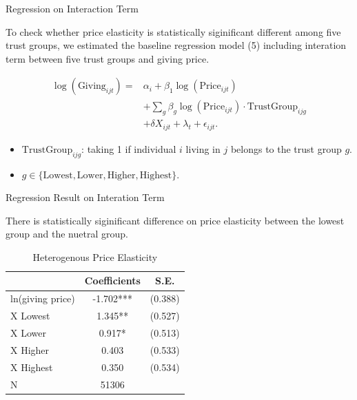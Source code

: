 \documentclass[
  ignorenonframetext,
]{beamer}
\providecommand{\tightlist}{%
  \setlength{\itemsep}{0pt}\setlength{\parskip}{0pt}}
\begin{document}
\begin{frame}{Regression on Interaction Term}
\protect\hypertarget{regression-on-interaction-term}{}

To check whether price elasticity is statistically siginificant
different among five trust groups, we estimated the baseline regression
model (5) including interation term between five trust groups and giving
price.

\begin{align*}
    \log(\text{Giving}_{ijt}) 
    =& \alpha_i + \beta_1 \log(\text{Price}_{ijt}) \\
    &+ \sum_g \beta_g \log(\text{Price}_{ijt}) \cdot \text{TrustGroup}_{ijg}  \\
    &+ \delta X_{ijt} + \lambda_t + \epsilon_{ijt}.
\end{align*}

\begin{itemize}
\tightlist
\item
  \(\text{TrustGroup}_{ijg}\): taking 1 if individual \(i\) living in
  \(j\) belongs to the trust group \(g\).
\item
  \(g \in \{ \text{Lowest}, \text{Lower}, \text{Higher}, \text{Highest} \}\).
\end{itemize}

\end{frame}

\begin{frame}{Regression Result on Interation Term}
\protect\hypertarget{regression-result-on-interation-term}{}

There is statistically siginificant difference on price elasticity
between the lowest group and the nuetral group.

\begin{table}

\caption{\label{tab:kableEstimateInteractionByTrustGroup}Heterogenous Price Elasticity}
\centering
\begin{tabular}[t]{lcc}
\toprule
 & Coefficients & S.E.\\
\midrule
ln(giving price) & -1.702*** & (0.388)\\
\hspace{1em}X Lowest & 1.345** & (0.527)\\
\hspace{1em}X Lower & 0.917* & (0.513)\\
\hspace{1em}X Higher & 0.403 & (0.533)\\
\hspace{1em}X Highest & 0.350 & (0.534)\\
N & 51306 & \\
\bottomrule
\end{tabular}
\end{table}

\end{frame}
\end{document}
